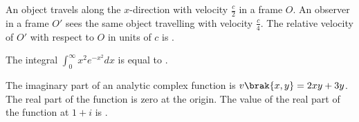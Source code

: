 \item An object travels along the $x$-direction with velocity $\frac{c}{2}$ in a frame $O$. An observer in a frame $O'$ sees the same object travelling with velocity $\frac{c}{4}$. The relative velocity of $O'$ with respect to $O$ in units of $c$ is  .

 \item The integral $\int_{0}^{\infty} x^2 e^{-x^2} dx$ is equal to  .

 \item The imaginary part of an analytic complex function is $v\brak{x,y} = 2xy + 3y$. The real part of the function is zero at the origin. The value of the real part of the function at $1 + i$ is .


